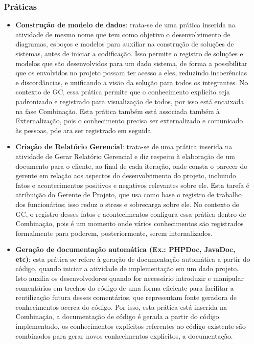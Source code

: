 \subsubsection{Práticas}
\begin{itemize}
\item \textbf{Construção de modelo de dados}: trata-se de uma prática inserida na atividade de mesmo nome que tem como objetivo o desenvolvimento de diagramas, esboços e modelos para auxiliar na construção de soluções de sistemas, antes de iniciar a codificação. Isso permite o registro de soluções e modelos que são desenvolvidos para um dado sistema, de forma a possibilitar que os envolvidos no projeto possam ter acesso a eles, reduzindo incoerências e discordâncias, e unificando a visão da solução para todos os integrantes. No contexto de GC, essa prática permite que o conhecimento explicíto seja padronizado e registrado para visualização de todos, por isso está encaixada na fase Combinação. Esta prática também está associada também à Externalização, pois o conhecimento precisa ser externalizado e comunicado às pessoas, pde ara  ser registrado em seguida.
\item \textbf{Criação de Relatório Gerencial}: trata-se de uma prática inserida na atividade de Gerar Relatório Gerencial e diz respeito à elaboração de um documento para o cliente, ao final de cada iteração, onde consta o parecer do gerente em relação aos aspectos do desenvolvimento do projeto, incluindo fatos e acontecimentos positivos e negativos relevantes sobre ele. Esta tarefa é atribuição do Gerente de Projeto, que usa como base o registro de trabalho dos funcionários; isso reduz o stress e sobrecarga sobre ele. No contexto de GC, o registro desses fatos e acontecimentos configura essa prática dentro de Combinação, pois é um momento onde vários conhecimentos são registrados formalmente para poderem, posteriormente, serem internalizados. 
\item \textbf{Geração de documentação automática (Ex.: PHPDoc, JavaDoc, etc)}: esta prática se refere à geração de documentação automática a partir do código, quando iniciar a atividade de implementação em um dado projeto. Isto auxilia os desenvolvedores quando for necessário introduzir e manipular comentários em trechos do código de uma forma eficiente para facilitar a reutilização futura desses comentários, que representam fonte geradora de conhecimentos acerca do código. Por isso, esta prática está inserida na Combinação, a documentação de código é gerada a partir do código implementado, os conhecimentos explícitos referentes ao código existente são combinados para gerar novos conhecimentos explícitos, a documentação.

\end{itemize}
